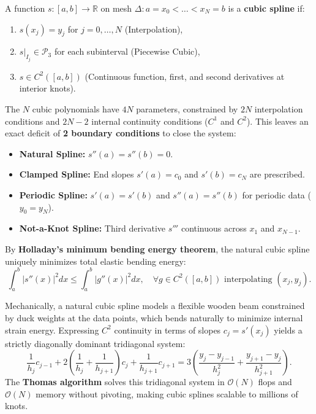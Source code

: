 \begin{definition}
    A function $s: [a, b] \to \mathbb{R}$ on mesh $\Delta: a = x_0 < \dots < x_N = b$ is a \textbf{cubic spline} if:
    \begin{enumerate}
        \item $s(x_j) = y_j$ for $j=0, \dots, N$ (Interpolation),
        \item $s|_{I_j} \in \mathcal{P}_3$ for each subinterval (Piecewise Cubic),
        \item $s \in C^2([a, b])$ (Continuous function, first, and second derivatives at interior knots).
    \end{enumerate}
    The $N$ cubic polynomials have $4N$ parameters, constrained by $2N$ interpolation conditions and $2N-2$ internal continuity conditions ($C^1$ and $C^2$). This leaves an exact deficit of \textbf{2 boundary conditions} to close the system:
    \begin{itemize}
        \item \textbf{Natural Spline:} $s''(a) = s''(b) = 0$.
        \item \textbf{Clamped Spline:} End slopes $s'(a) = c_0$ and $s'(b) = c_N$ are prescribed.
        \item \textbf{Periodic Spline:} $s'(a) = s'(b)$ and $s''(a) = s''(b)$ for periodic data ($y_0 = y_N$).
        \item \textbf{Not-a-Knot Spline:} Third derivative $s'''$ continuous across $x_1$ and $x_{N-1}$.
    \end{itemize}
\end{definition}

\begin{theorem}
    By \textbf{Holladay's minimum bending energy theorem}, the natural cubic spline uniquely minimizes total elastic bending energy:
    \begin{equation}
        \int_{a}^{b} |s''(x)|^2 dx \le \int_{a}^{b} |g''(x)|^2 dx, \quad \forall g \in C^2([a, b]) \text{ interpolating } (x_j, y_j).
    \end{equation}
\end{theorem}

Mechanically, a natural cubic spline models a flexible wooden beam constrained by duck weights at the data points, which bends naturally to minimize internal strain energy. Expressing $C^2$ continuity in terms of slopes $c_j = s'(x_j)$ yields a strictly diagonally dominant tridiagonal system:
\begin{equation}
    \frac{1}{h_j} c_{j-1} + 2\left(\frac{1}{h_j} + \frac{1}{h_{j+1}}\right) c_j + \frac{1}{h_{j+1}} c_{j+1} = 3\left( \frac{y_j - y_{j-1}}{h_j^2} + \frac{y_{j+1} - y_j}{h_{j+1}^2} \right).
\end{equation}
The \textbf{Thomas algorithm} solves this tridiagonal system in $\mathcal{O}(N)$ flops and $\mathcal{O}(N)$ memory without pivoting, making cubic splines scalable to millions of knots.

